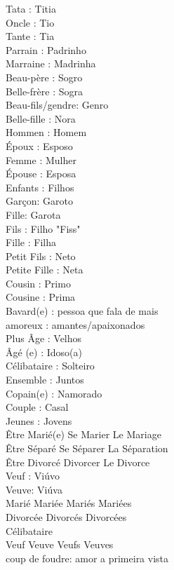 \documentclass{article}
\begin{document}
               Tata            : Titia\\
               Oncle           : Tio\\
               Tante           : Tia\\
               Parrain         : Padrinho\\
               Marraine        : Madrinha\\
               Beau-père       : Sogro\\
               Belle-frère     : Sogra\\
               Beau-fils/gendre: Genro\\
               Belle-fille     : Nora\\
               Hommen          : Homem\\
               Époux           : Esposo\\
               Femme           : Mulher\\
               Épouse          : Esposa\\
               Enfants         : Filhos\\
               Garçon: Garoto\\
               Fille: Garota\\
               Fils            : Filho "Fiss"\\
               Fille           : Filha\\
        Petit  Fils            : Neto\\
        Petite Fille           : Neta\\
               Cousin          : Primo\\
               Cousine         : Prima\\
        Bavard(e)              : pessoa que fala de mais\\
               amoreux         : amantes/apaixonados\\
        Plus   Âge             : Velhos\\
        Âgé    (e)             : Idoso(a)\\
               Célibataire     : Solteiro\\
               Ensemble        : Juntos\\
        Copain(e)              : Namorado\\
               Couple          : Casal\\
               Jeunes          : Jovens\\
        Être Marié(e) Se Marier Le Mariage\\
        Être Séparé Se Séparer La Séparation\\
        Être Divorcé Divorcer Le Divorce\\
        Veuf : Viúvo\\
        Veuve: Viúva\\
        Marié Mariée Mariés Mariées\\
        Divorcée     Divorcés Divorcées\\
        Célibataire\\
        Veuf Veuve Veufs Veuves\\
        coup de foudre: amor a primeira vista\\
        
\end{document}
